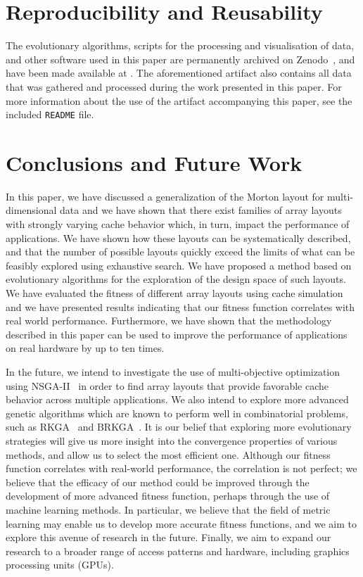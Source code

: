 \section{Reproducibility and Reusability}

The evolutionary algorithms, scripts for the processing and visualisation of data, and other software used in this paper are permanently archived on Zenodo~\cite{swatman_2024_10567243}, and have been made available at . The aforementioned artifact also contains all data that was gathered and processed during the work presented in this paper. For more information about the use of the artifact accompanying this paper, see the included \texttt{README} file.

\section{Conclusions and Future Work}

\label{sec:conclusion}

In this paper, we have discussed a generalization of the Morton layout for multi-dimensional data and we have shown that there exist families of array layouts with strongly varying cache behavior which, in turn, impact the performance of applications. We have shown how these layouts can be systematically described, and that the number of possible layouts quickly exceed the limits of what can be feasibly explored using exhaustive search. We have proposed a method based on evolutionary algorithms for the exploration of the design space of such layouts. We have evaluated the fitness of different array layouts using cache simulation and we have presented results indicating that our fitness function correlates with real world performance. Furthermore, we have shown that the methodology described in this paper can be used to improve the performance of applications on real hardware by up to ten times.

In the future, we intend to investigate the use of multi-objective optimization using NSGA-II~\cite{996017} in order to find array layouts that provide favorable cache behavior across multiple applications. We also intend to explore more advanced genetic algorithms which are known to perform well in combinatorial problems, such as RKGA~\cite{doi:10.1287/ijoc.6.2.154} and BRKGA~\cite{Goncalves2011}. It is our belief that exploring more evolutionary strategies will give us more insight into the convergence properties of various methods, and allow us to select the most efficient one. Although our fitness function correlates with real-world performance, the correlation is not perfect; we believe that the efficacy of our method could be improved through the development of more advanced fitness function, perhaps through the use of machine learning methods. In particular, we believe that the field of metric learning may enable us to develop more accurate fitness functions, and we aim to explore this avenue of research in the future. Finally, we aim to expand our research to a broader range of access patterns and hardware, including graphics processing units (GPUs).
